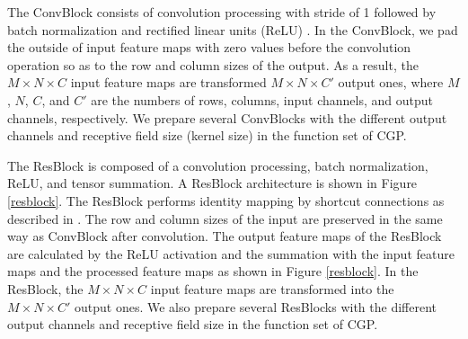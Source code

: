 The ConvBlock consists of  convolution processing with  stride of 1 followed by batch normalization \cite{ioffe_batch_2015} and rectified linear units (ReLU) \cite{nair_rectified_2010}. In the ConvBlock, we pad the outside of input feature maps with zero values before the convolution operation so as to  the row and column sizes of the output. 
As a result, the $M \times N \times C$ input feature maps are transformed  $M \times N \times C'$ output ones, where $M$, $N$, $C$, and $C'$ are the numbers of rows, columns, input channels, and output channels, respectively.
We prepare several ConvBlocks with the different output channels and  receptive field size (kernel size) in the function set of CGP.

The ResBlock is composed of a convolution processing, batch normalization, ReLU, and tensor summation. A ResBlock architecture is shown in Figure \ref{resblock}.
The ResBlock performs identity mapping by shortcut connections as described in \cite{he_deep_2016}.
The row and column sizes of the input are preserved in the same way as ConvBlock after convolution.
The output feature maps of the ResBlock are calculated by the ReLU activation and the summation with the input feature maps and the processed feature maps as shown in Figure \ref{resblock}.
In the ResBlock, the $M \times N \times C$ input feature maps are transformed into the $M\times N\times C'$ output ones.
We also prepare several ResBlocks with the different output channels and  receptive field size in the function set of CGP.

